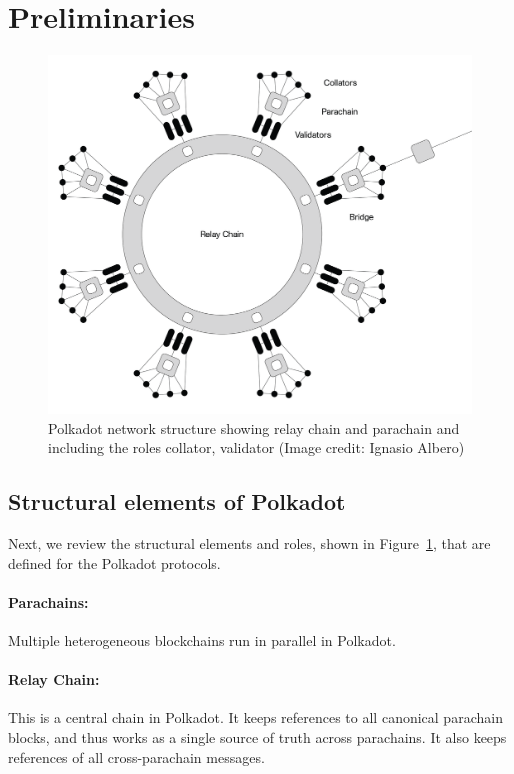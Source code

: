 \section{Preliminaries}\label{sec:preliminiary}
\begin{figure}[h]
	\centering
	\includegraphics[width=.7\textwidth]{images/Network@2x.png}
	\caption{Polkadot network structure showing relay chain and parachain and including the roles collator, validator (Image credit: Ignasio Albero)}
	\label{fig:roles}
\end{figure}
\subsection{Structural elements of Polkadot}
Next, we review the structural elements and roles, shown in Figure~\ref{fig:roles}, that are defined for the Polkadot protocols.
\paragraph{Parachains:} Multiple heterogeneous blockchains run in parallel in Polkadot.

\paragraph{Relay Chain:} This is a central chain in Polkadot. It keeps references
to all canonical parachain blocks, and thus works as a single source of truth across parachains.
It also keeps references of all cross-parachain messages.

